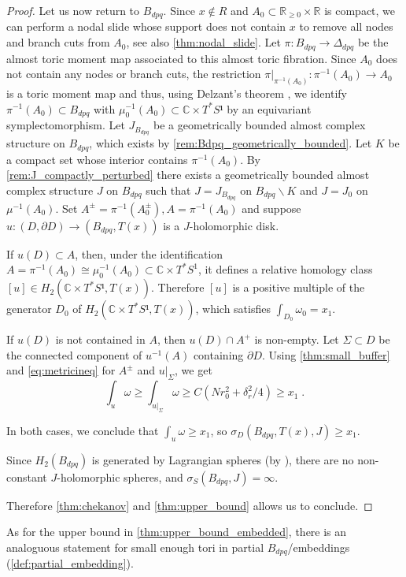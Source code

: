 \documentclass[12pt,a4paper,abstract=true,final]{scrartcl}
\begin{document}
\begin{proof}
  Let us now return to $B_{dpq}$.
  Since $x \notin R$ and $A_0 \subset \mathbb{R}_{≥ 0} \times \mathbb{R}$ is compact, we can perform a nodal slide whose support does not contain $x$ to remove all nodes and branch cuts from $A_0$, see also \cref{thm:nodal_slide}.
  Let $\pi \colon B_{dpq} \rightarrow \Delta_{dpq}$ be the almost toric moment map associated to this almost toric fibration.
  Since $A_0$ does not contain any nodes or branch cuts, the restriction $\pi\vert_{\pi^{-1}(A_0)} \colon \pi^{-1}(A_0) \rightarrow A_0$ is a toric moment map and thus, using Delzant's theorem \cite[Theorem 2.1]{Del88}, we identify $\pi^{-1}(A_0) ⊂ B_{dpq}$ with $μ_0^{-1}(A_0) ⊂ ℂ × T^* S¹$ by an equi\-va\-ri\-ant symplectomorphism.
  Let $J_{B_{dpq}}$ be a geometrically bounded almost complex structure on $B_{dpq}$, which exists by \cref{rem:Bdpq_geometrically_bounded}.
  Let $K$ be a compact set whose interior contains $π^{-1}(A_0)$.
  By \cref{rem:J_compactly_perturbed} there exists a geometrically bounded almost complex structure $J$ on $B_{dpq}$ such that $J=J_{B_{dpq}}$ on $B_{dpq} ∖ K$ and $J=J_0$ on $μ^{-1}(A_0)$.
  Set $A^± = \pi^{-1}(A_0^±), A = \pi^{-1}(A_0)$ and suppose $u\colon (D,∂D) → (B_{dpq}, T(x))$ is a $J$-holomorphic disk. 
  
  If $u(D) ⊂ A$, then, under the identification $A=\pi^{-1}(A_0) \cong μ_0^{-1}(A_0) \subset \mathbb{C} \times T^*S^1$, it defines a relative homology class $[u] ∈ H_2(ℂ × T^*S¹, T(x))$.
Therefore $[u]$ is a positive multiple of the generator $D_0$ of $H_2(ℂ × T^*S¹, T(x))$, which satisfies $∫_{D_0} ω_0 = x_1$.
  
  If $u(D)$ is not contained in $A$, then $u(D) ∩ A^+$ is non-empty.
Let $Σ ⊂ D$ be the connected component of $u^{-1}(A)$ containing $∂D$.
Using \cref{thm:small_buffer} and \eqref{eq:metricineq} for $A^±$ and $u|_Σ$, we get
  \[∫_u ω ≥ ∫_{u|_Σ} ω ≥ C(Nr_0^2 + δ_r^2/4) ≥ x_1 \;. \]

In both cases, we conclude that $∫_{u} ω ≥ x_1$, so $σ_D(B_{dpq},T(x),J) ≥ x_1$.

Since $H_2(B_{dpq})$ is generated by Lagrangian spheres (by \cite[Lemma 7.11]{evans2021atfs}), there are no non-constant $J$-holomorphic spheres, and $σ_S(B_{dpq},J) = ∞$.

Therefore \cref{thm:chekanov} and \cref{thm:upper_bound} allows us to conclude.
\end{proof}

As for the upper bound in \cref{thm:upper_bound_embedded}, there is an analoguous statement for small enough tori in partial $B_{dpq}$\-/embeddings (\cref{def:partial_embedding}).
\end{document}
